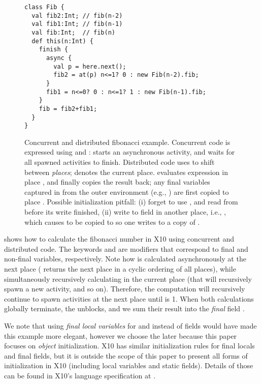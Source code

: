 \begin{figure}
\begin{lstlisting}
class Fib {
  val fib2:Int; // fib(n-2)
  val fib1:Int; // fib(n-1)
  val fib:Int;  // fib(n)
  def this(n:Int) {
    finish {
      async {
        val p = here.next();
        fib2 = at(p) n<=1? 0 : new Fib(n-2).fib;
      }
      fib1 = n<=0? 0 : n<=1? 1 : new Fib(n-1).fib;
    }
    fib = fib2+fib1;
  }
}
\end{lstlisting}
\caption{Concurrent and distributed fibonacci example.
    Concurrent code is expressed using  and :
         starts an asynchronous activity,
        and  waits for all spawned activities to finish.
    Distributed code uses  to shift between
        \emph{places};
         denotes the current place.
     evaluates expression 
        in place , and finally copies the result back;
        any final variables captured in  from
        the outer environment (e.g., )
        are first copied to place .
    Possible initialization pitfall:
        (i) %
            forget to use ,
            and read from  before its write finished,
        (ii) %
            write to field  in another place, i.e.,
            ,
            which causes \this to be copied to 
            so one writes to a copy of \this.
    }
\label{Figure:DistributedFib}
\end{figure}

 shows how to calculate the fibonacci number  in X10
    using concurrent and distributed code.
The keywords  and  are modifiers that correspond to final and non-final variables, respectively.
Note how  is calculated asynchronously at the next place ( returns the next place in a cyclic ordering of all places),
    while simultaneously recursively calculating  in the current place (that will recursively spawn a new activity, and so on).
Therefore, the computation will recursively continue to spawn activities at the next place until  is 1.
When both calculations globally terminate, the  unblocks,
    and we sum their result into the \emph{final} field .

We note that using \emph{final local variables} for  and  instead of fields
    would have made this example
    more elegant, however we choose the later because this paper focuses on \emph{object} initialization.
X10 has similar initialization rules for final locals and final fields,
    but it is outside the scope of this paper to present all forms of initialization in X10
    (including local variables and static fields).
Details of those can be found in X10's language specification at .

